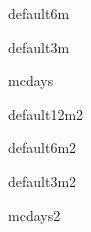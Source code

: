 \documentclass{article}
\begin{document}
default6m \newline \newline

\newpage

default3m \newline \newline

\newpage

mcdays \newline \newline

\newpage

default12m2 \newline \newline

\newpage

default6m2 \newline \newline

\newpage

default3m2 \newline \newline

\newpage

mcdays2 \newline \newline

\newpage
\end{document}
